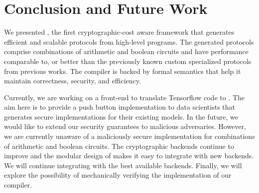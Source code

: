 \section{Conclusion and Future Work}
\label{sec:conclude}

We presented \tool, the first
cryptographic-cost aware framework that generates efficient and
scalable \mpc protocols from high-level programs.
The generated protocols comprise combinations
of arithmetic and boolean circuits and have performance comparable to, or better than the previously known custom specialized
protocols from previous works.
The compiler is backed by formal semantics that help 
it maintain correctness, security,
and efficiency.

Currently, we are working on a front-end to translate Tensorflow code to \tool. The aim here is to provide a push button implementation to data scientists that generates secure implementations for their existing models.  
In the future, we would like to extend our security guarantees to malicious adversaries. However, we are currently unaware of a maliciously secure \mpc implementation for combinations of
arithmetic and boolean circuits. The cryptographic backends continue to improve and the modular design of \tool makes it easy to integrate with new backends. We will continue integrating with the best available backends.
Finally, we will explore the possibility of mechanically verifying the implementation of our compiler.







